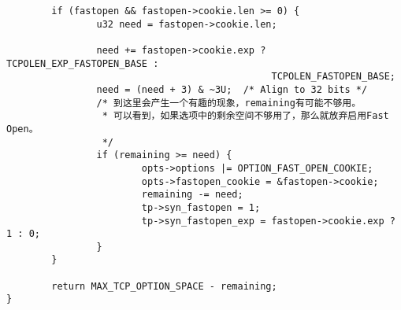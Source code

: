 \begin{verbatim}
        if (fastopen && fastopen->cookie.len >= 0) {
                u32 need = fastopen->cookie.len;

                need += fastopen->cookie.exp ? TCPOLEN_EXP_FASTOPEN_BASE :
                                               TCPOLEN_FASTOPEN_BASE;
                need = (need + 3) & ~3U;  /* Align to 32 bits */
                /* 到这里会产生一个有趣的现象，remaining有可能不够用。
                 * 可以看到，如果选项中的剩余空间不够用了，那么就放弃启用Fast Open。
                 */
                if (remaining >= need) {
                        opts->options |= OPTION_FAST_OPEN_COOKIE;
                        opts->fastopen_cookie = &fastopen->cookie;
                        remaining -= need;
                        tp->syn_fastopen = 1;
                        tp->syn_fastopen_exp = fastopen->cookie.exp ? 1 : 0;
                }
        }

        return MAX_TCP_OPTION_SPACE - remaining;
}
\end{verbatim}

